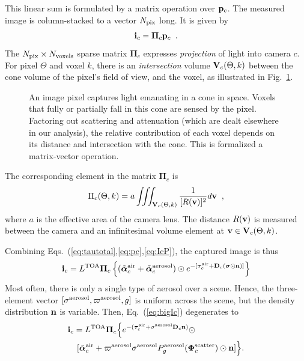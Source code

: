\documentclass[10pt,letterpaper]{article}
\newcommand{\vect}[1]{\bm{#1}}
\newcommand{\yoavcomment}[1]{}
\renewcommand{\yoavcomment}[1]{#1} %
\begin{document}
This linear sum is formulated by a matrix operation over ${\bf
  p}_c$. The measured image is column-stacked to a vector $N_{\rm
  pix}$ long. It is given by
\begin{equation}
  {\bf i}_c= {\vect{\Pi}}_c{\bf p}_c
  \;\;.
  \label{eq:IcP}
\end{equation}
The $N_{\rm pix}\times N_{\rm voxels}$ sparse matrix ${\vect{\Pi}}_c$
expresses {\em projection} of light into camera $c$. For pixel
$\Theta$ and voxel $k$, there is an {\em intersection} volume ${\bf
  V}_c(\Theta,k)$ between the cone volume of the pixel's field of
view, and the voxel, as illustrated in Fig.~\ref{fig:projection}.
\begin{figure}
  \centering
  \yoavcomment{\def\svgwidth{\columnwidth}}
  \caption{\small An image pixel captures light emanating in a cone in
    space. Voxels that fully or partially fall in this cone are sensed
    by the pixel. Factoring out scattering and attenuation (which are
    dealt elsewhere in our analysis), the relative contribution of
    each voxel depends on its distance and intersection with the
    cone. This is formalized a matrix-vector operation.}
  \label{fig:projection}
\end{figure}
The corresponding element in the matrix ${\vect{\Pi}}_c$ is
\begin{equation}
  \Pi_c(\Theta,k)=
  a
  \iiint_{{\bf V}_c(\Theta,k)}
  \frac{1}{[R({\bf v})]^2} d{\bf v}
  \;\;,
  \label{eq:Pc}
\end{equation}
where $a$ is the effective area of the camera lens.
The distance $R({\bf v})$ is measured between the camera and an
infinitesimal volume element at ${\bf v}\in {\bf V}_c(\Theta,k)$.

Combining Eqs.~(\ref{eq:tautotal},\ref{eq:pc},\ref{eq:IcP}), the
captured image is thus
\begin{align}
  {\bf i}_c= L^{\rm TOA} {\vect{\Pi}}_c \left\{
    (\tilde{\vect{\alpha}}^{\rm air}_c + \tilde{\vect{\alpha}}^{\rm
      aerosol}_c) \odot e^{-[\vect{\tau}_c^{\rm air} + {\bf D}_c
      (\vect{\sigma} \odot {\bf n})]} \right\}
  \label{eq:bigIc}
\end{align}
Most often, there is only a single type of aerosol over a
scene. Hence, the three-element vector $[{\sigma}^{\rm
  aerosol},\varpi^{\rm aerosol},g]$ is uniform across the scene, but
the density distribution ${\bf n}$ is variable. Then,
Eq.~(\ref{eq:bigIc}) degenerates to
\begin{align}
  {\bf i}_c= L^{\rm TOA} {\vect{\Pi}}_c \Big\{ e^{-(\vect{\tau}_c^{\rm
      air} + {\sigma}^{\rm aerosol} {\bf D}_c {\bf n}) }\odot
  \;\;\;\;\;\;\;\;\;\;\;\;\;\;\;\;\;\;\;\;\;
  \nonumber \\
  [\tilde{\vect{\alpha}}^{\rm air}_c + %
  \varpi^{\rm aerosol}\sigma^{\rm aerosol} P^{\rm
    aerosol}_g(\vect{\Phi}^{\rm scatter}_c) \odot{\bf n} ] \Big\} .
  \label{eq:bigIA}
\end{align}
\end{document}
